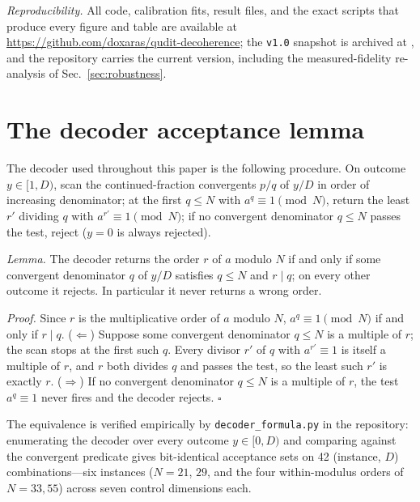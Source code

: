\documentclass[aps,pra,reprint,superscriptaddress,nofootinbib,floatfix]{revtex4-2}
\begin{document}
\emph{Reproducibility.} All code, calibration fits, result files, and
the exact scripts that produce every figure and table are available at
\url{https://github.com/doxaras/qudit-decoherence}; the
\texttt{v1.0} snapshot is archived at ,
and the repository carries the current version, including the
measured-fidelity re-analysis of Sec.~\ref{sec:robustness}.

\appendix

\section{The decoder acceptance lemma}
\label{app:decoder}

The decoder used throughout this paper is the following procedure. On
outcome $y\in[1,D)$, scan the continued-fraction convergents $p/q$ of
$y/D$ in order of increasing denominator; at the first $q\le N$ with
$a^{q}\equiv1 \pmod N$, return the least $r'$ dividing $q$ with
$a^{r'}\equiv1 \pmod N$; if no convergent denominator $q\le N$ passes
the test, reject ($y=0$ is always rejected).

\emph{Lemma.} The decoder returns the order $r$ of $a$ modulo $N$ if
and only if some convergent denominator $q$ of $y/D$ satisfies $q\le
N$ and $r\mid q$; on every other outcome it rejects. In particular it
never returns a wrong order.

\emph{Proof.} Since $r$ is the multiplicative order of $a$ modulo
$N$, $a^{q}\equiv1\pmod N$ if and only if $r\mid q$. ($\Leftarrow$) Suppose some convergent denominator
$q\le N$ is a multiple of $r$; the scan stops at the first such $q$.
Every divisor $r'$ of $q$ with $a^{r'}\equiv1$ is itself a multiple of
$r$, and $r$ both divides $q$ and passes the test, so the least such
$r'$ is exactly $r$. ($\Rightarrow$) If no convergent denominator
$q\le N$ is a multiple of $r$, the test $a^{q}\equiv1$ never fires and
the decoder rejects. \hfill$\square$

The equivalence is verified empirically by
\texttt{decoder\_formula.py} in the repository: enumerating the
decoder over every outcome $y\in[0,D)$ and comparing against the
convergent predicate gives bit-identical acceptance sets on 42
(instance, $D$) combinations---six instances ($N=21$, $29$, and the
four within-modulus orders of $N=33,55$) across seven control
dimensions each.
\end{document}
